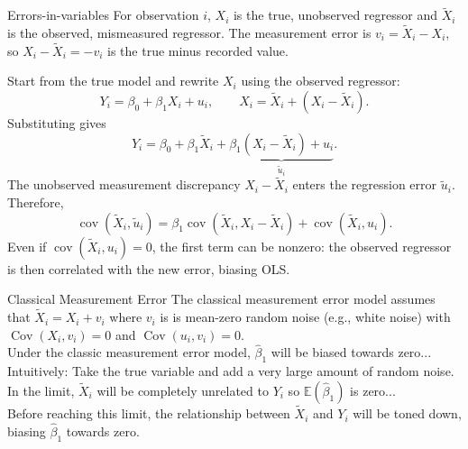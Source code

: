 \documentclass[notes,10pt, aspectratio=169]{beamer}
\begin{document}
\begin{frame}{Errors-in-variables}
\small
\setlength{\abovedisplayskip}{4pt}
\setlength{\belowdisplayskip}{4pt}
For observation $i$, $X_i$ is the true, unobserved regressor and $\tilde{X}_i$ is the observed, mismeasured regressor. The measurement error is $v_i=\tilde{X}_i-X_i$, so $X_i-\tilde{X}_i=-v_i$ is the true minus recorded value.

\medskip
Start from the true model and rewrite $X_i$ using the observed regressor:
\[
    Y_i=\beta_0+\beta_1 X_i+u_i,
    \qquad X_i=\tilde{X}_i+(X_i-\tilde{X}_i).
\]
Substituting gives
\[
    Y_i=\beta_0+\beta_1\tilde{X}_i+\underbrace{\beta_1(X_i-\tilde{X}_i)+u_i}_{\tilde{u}_i}.
\]
The unobserved measurement discrepancy $X_i-\tilde{X}_i$ enters the regression error $\tilde{u}_i$. Therefore,
\[
    \operatorname{cov}(\tilde{X}_i,\tilde{u}_i)
    =\beta_1\operatorname{cov}(\tilde{X}_i,X_i-\tilde{X}_i)
    +\operatorname{cov}(\tilde{X}_i,u_i).
\]
Even if $\operatorname{cov}(\tilde{X}_i,u_i)=0$, the first term can be nonzero: the observed regressor is then correlated with the new error, biasing OLS.
\end{frame}

\begin{frame}{Classical Measurement Error}
The classical measurement error model assumes that $\tilde{X}_i=X_i+v_i$ where $v_i$ is is mean-zero random noise (e.g., white noise) with $\operatorname{Cov}(X_i,v_i)=0$ and $\operatorname{Cov}(u_i,v_i)=0$.\\[1em]

Under the classic measurement error model, $\hat{\beta}_1$ will be biased towards zero...\\[1em]

Intuitively: Take the true variable and add a very large amount of random noise. In the limit, $\tilde{X}_i$ will be completely unrelated to $Y_i$ so $\mathbb{E}(\hat{\beta}_1)$ is zero...\\[1em]

Before reaching this limit, the relationship between  $\tilde{X}_i$ and $Y_i$ will be toned down, biasing $\hat{\beta}_1$ towards zero.\\[1em]

\end{frame}
\end{document}

